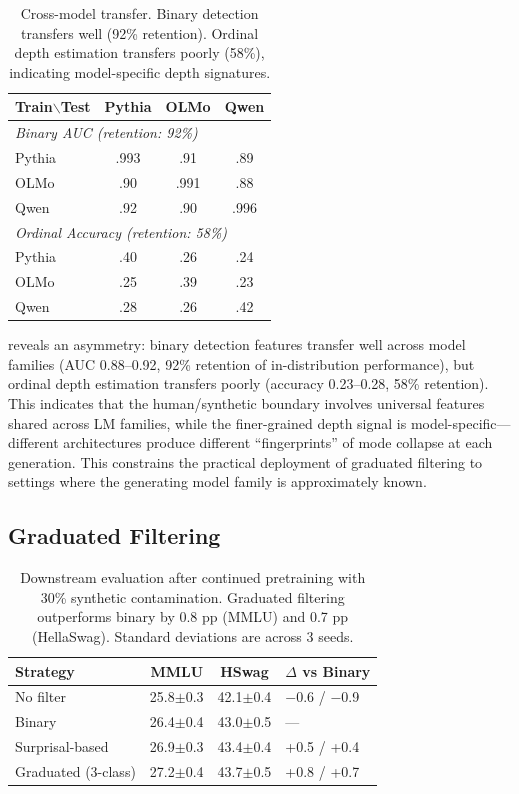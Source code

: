 \documentclass[11pt,a4paper]{article}
\begin{document}
\begin{table}[t]
\centering
\small
\begin{tabular}{lccc}
\toprule
\textbf{Train$\backslash$Test} & \textbf{Pythia} & \textbf{OLMo} & \textbf{Qwen} \\
\midrule
\multicolumn{4}{l}{\emph{Binary AUC (retention: 92\%)}} \\
Pythia & .993 & .91 & .89 \\
OLMo & .90 & .991 & .88 \\
Qwen & .92 & .90 & .996 \\
\midrule
\multicolumn{4}{l}{\emph{Ordinal Accuracy (retention: 58\%)}} \\
Pythia & .40 & .26 & .24 \\
OLMo & .25 & .39 & .23 \\
Qwen & .28 & .26 & .42 \\
\bottomrule
\end{tabular}
\caption{Cross-model transfer. Binary detection transfers well (92\% retention). Ordinal depth estimation transfers poorly (58\%), indicating model-specific depth signatures.}
\label{tab:transfer}
\end{table}

 reveals an asymmetry: binary detection features transfer well across model families (AUC 0.88--0.92, 92\% retention of in-distribution performance), but ordinal depth estimation transfers poorly (accuracy 0.23--0.28, 58\% retention). This indicates that the human/synthetic boundary involves universal features shared across LM families, while the finer-grained depth signal is model-specific---different architectures produce different ``fingerprints'' of mode collapse at each generation. This constrains the practical deployment of graduated filtering to settings where the generating model family is approximately known.

\subsection{Graduated Filtering}
\label{sec:filtering}

\begin{table}[t]
\centering
\small
\begin{tabular}{lccl}
\toprule
\textbf{Strategy} & \textbf{MMLU} & \textbf{HSwag} & \textbf{$\Delta$ vs Binary} \\
\midrule
No filter & 25.8\tiny{$\pm$0.3} & 42.1\tiny{$\pm$0.4} & $-$0.6 / $-$0.9 \\
Binary & 26.4\tiny{$\pm$0.4} & 43.0\tiny{$\pm$0.5} & --- \\
Surprisal-based & 26.9\tiny{$\pm$0.3} & 43.4\tiny{$\pm$0.4} & +0.5 / +0.4 \\
Graduated (3-class) & 27.2\tiny{$\pm$0.4} & 43.7\tiny{$\pm$0.5} & +0.8 / +0.7 \\
\bottomrule
\end{tabular}
\caption{Downstream evaluation after continued pretraining with 30\% synthetic contamination. Graduated filtering outperforms binary by 0.8 pp (MMLU) and 0.7 pp (HellaSwag). Standard deviations are across 3 seeds.}
\label{tab:downstream}
\end{table}
\end{document}
